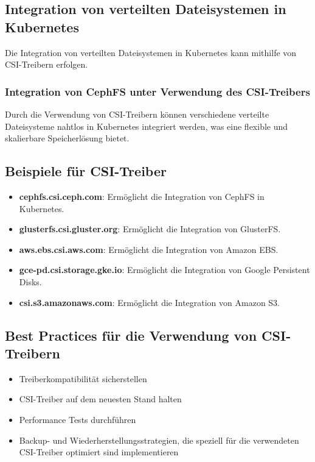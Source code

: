 \subsection{Integration von verteilten Dateisystemen in Kubernetes}
Die Integration von verteilten Dateisystemen in Kubernetes kann mithilfe von CSI-Treibern erfolgen.

\subsubsection{Integration von CephFS unter Verwendung des CSI-Treibers}


\noindent
Durch die Verwendung von CSI-Treibern können verschiedene verteilte Dateisysteme nahtlos in Kubernetes integriert werden, was eine flexible und skalierbare Speicherlösung bietet.
\newpage
\subsection{Beispiele für CSI-Treiber}
\begin{itemize}
    \item \textbf{cephfs.csi.ceph.com}: Ermöglicht die Integration von CephFS in Kubernetes.
    \item \textbf{glusterfs.csi.gluster.org}: Ermöglicht die Integration von GlusterFS.
    \item \textbf{aws.ebs.csi.aws.com}: Ermöglicht die Integration von Amazon EBS.
    \item \textbf{gce-pd.csi.storage.gke.io}: Ermöglicht die Integration von Google Persistent Disks.
    \item \textbf{csi.s3.amazonaws.com}: Ermöglicht die Integration von Amazon S3.
\end{itemize}

\subsection{Best Practices für die Verwendung von CSI-Treibern}
\begin{itemize}
    \item Treiberkompatibilität sicherstellen
    \item CSI-Treiber auf dem neuesten Stand halten
    \item Performance Tests durchführen
    \item Backup- und Wiederherstellungsstrategien, die speziell für die verwendeten CSI-Treiber optimiert sind implementieren
\end{itemize}
